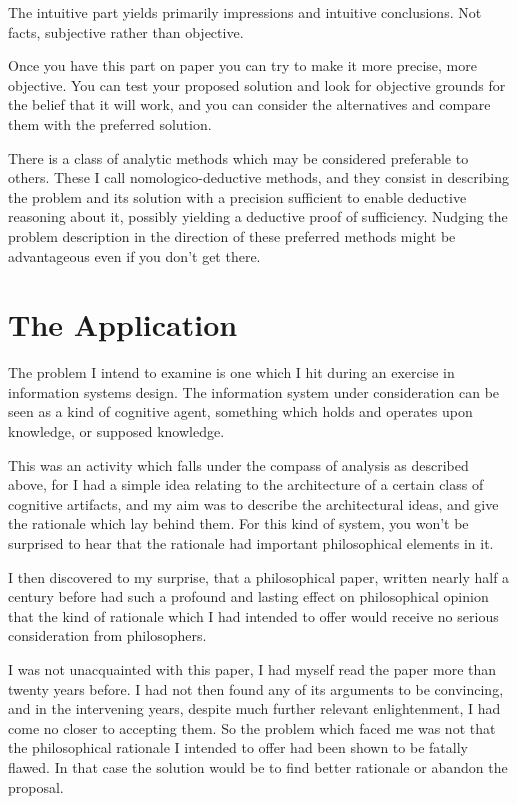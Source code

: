 The intuitive part yields primarily impressions and intuitive conclusions.
Not facts, subjective rather than objective.

Once you have this part on paper you can try to make it more precise, more objective.
You can test your proposed solution and look for objective grounds for the belief that it will work, and you can consider the alternatives and compare them with the preferred solution.

There is a class of analytic methods which may be considered preferable to others.
These I call nomologico-deductive methods, and they consist in describing the problem and its solution with a precision sufficient to enable deductive reasoning about it, possibly yielding a deductive proof of sufficiency.
Nudging the problem description in the direction of these preferred methods might be advantageous even if you don't get there.

\section{The Application}

The problem I intend to examine is one which I hit during an exercise in information systems design.
The information system under consideration can be seen as a kind of cognitive agent, something which holds and operates upon knowledge, or supposed knowledge.

This was an activity which falls under the compass of analysis as described above, for I had a simple idea relating to the architecture of a certain class of cognitive artifacts, and my aim was to describe the architectural ideas, and give the rationale which lay behind them.
For this kind of system, you won't be surprised to hear that the rationale had important philosophical elements in it.

I then discovered to my surprise, that a philosophical paper, written nearly half a century before had such a profound and lasting effect on philosophical opinion that the kind of rationale which I had intended to offer would receive no serious consideration from philosophers.

I was not unacquainted with this paper, I had myself read the paper more than twenty years before.
I had not then found any of its arguments to be convincing, and in the intervening years, despite much further relevant enlightenment, I had come no closer to accepting them.
So the problem which faced me was not that the philosophical rationale I intended to offer had been shown to be fatally flawed.
In that case the solution would be to find better rationale or abandon the proposal.

